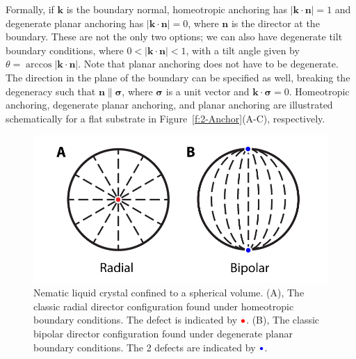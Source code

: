 Formally, if $\mathbf{k}$ is the boundary normal, homeotropic anchoring has $|\mathbf{k} \cdot \mathbf{n}| = 1$ and degenerate planar anchoring has $|\mathbf{k} \cdot \mathbf{n}| = 0$, where $\mathbf{n}$ is the director at the boundary.
These are not the only two options; we can also have degenerate tilt boundary conditions, where $0< |\mathbf{k} \cdot \mathbf{n}| < 1$, with a tilt angle given by $\theta = \arccos |\mathbf{k} \cdot \mathbf{n}| $.
Note that planar anchoring does not have to be degenerate.
The direction in the plane of the boundary can be specified as well, breaking the degeneracy such that $\mathbf{n} \parallel \bm{\sigma}$, where $\bm{\sigma}$ is a unit vector and $\mathbf{k} \cdot \bm{\sigma} = 0$.
Homeotropic anchoring, degenerate planar anchoring, and planar anchoring are illustrated schematically for a flat substrate in Figure~\ref{f:2-Anchor}(A-C), respectively.

\begin{figure}
  \centering
  \includegraphics{figures/C2/Ch2-Figs_DropSchem.png}
  \caption{Nematic liquid crystal confined to a spherical volume.
  (A), The classic radial director configuration found under homeotropic boundary conditions.
  The defect is indicated by ${\color{red} \bullet}$.
  (B), The classic bipolar director configuration found under degenerate planar boundary conditions.
  The 2 defects are indicated by ${\color{blue} \bullet}$.}\label{f:2-DropSchem}
\end{figure}

